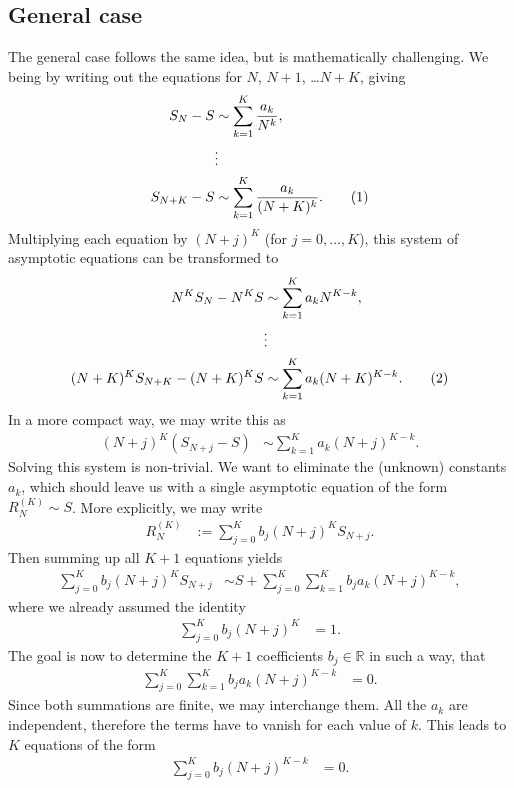 \documentclass[english, parskip=full]{scrartcl}
\newcommand\numberthis{\addtocounter{equation}{1}\tag{\theequation}}
\begin{document}
\subsection{General case}
The general case follows the same idea, but is mathematically challenging.
We being by writing out the equations for $N$, $N+1$, \dots $N+K$, giving
\begin{align*}
S_N - S &\sim \sum_{k=1}^K\frac{a_k}{N^k},\\
&\vdots \\
S_{N+K} - S &\sim \sum_{k=1}^K\frac{a_k}{(N+K)^k}. \numberthis
\end{align*}
Multiplying each equation by $(N+j)^K$ (for $j=0,\dots,K$), this system of asymptotic equations can be transformed to
\begin{align*}
N^KS_N - N^KS &\sim \sum_{k=1}^K a_kN^{K-k},\\
&\vdots \\
(N+K)^KS_{N+K} - (N+K)^KS &\sim \sum_{k=1}^K a_k(N+K)^{K-k}. \numberthis
\end{align*}
In a more compact way, we may write this as
\begin{align}
(N+j)^K (S_{N+j} - S) &\sim \sum_{k=1}^K a_k (N+j)^{K-k}.
\end{align}
Solving this system is non-trivial.
We want to eliminate the (unknown) constants $a_k$, which should leave us with a single asymptotic equation of the form $R_N^{(K)}\sim S$.
More explicitly, we may write
\begin{align}
R_N^{(K)} &:= \sum_{j=0}^K b_j (N+j)^K S_{N+j}.
\end{align}
Then summing up all $K+1$ equations yields
\begin{align}
\sum_{j=0}^K b_j  (N+j)^K S_{N+j} &\sim S + \sum_{j=0}^K \sum_{k=1}^K b_j  a_k (N+j)^{K-k},
\end{align}
where we already assumed the identity
\begin{align}
\sum_{j=0}^K b_j  (N+j)^K &= 1.
\end{align}
The goal is now to determine the $K+1$ coefficients $b_j\in\mathbb{R}$ in such a way, that
\begin{align}
\sum_{j=0}^K \sum_{k=1}^K b_j  a_k (N+j)^{K-k} &= 0.
\end{align}
Since both summations are finite, we may interchange them.
All the $a_k$ are independent, therefore the terms have to vanish for each value of $k$.
This leads to $K$ equations of the form
\begin{align}
\sum_{j=0}^K b_j (N+j)^{K-k} &= 0.
\end{align}
\end{document}
